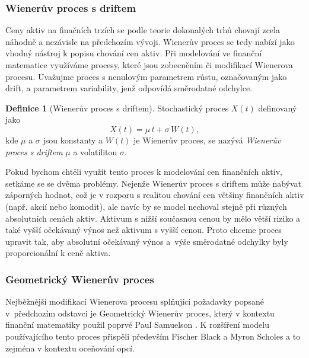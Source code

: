 \documentclass[a4paper,12pt]{report}
\theoremstyle{definition} \newtheorem{definice}[veta]{Definice}
\theoremstyle{remark}
\begin{document}
\subsubsection{Wienerův proces s driftem}
Ceny aktiv na finačních trzích se podle teorie dokonalých trhů chovají zcela náhodně a nezávisle na předchozím vývoji.
Wienerův proces se tedy nabízí jako vhodný nástroj k popisu chování cen aktiv.
Při modelování ve finanční matematice využíváme procesy, které jsou zobecněním či modifikací Wienerova procesu. 
Uvažujme proces s nenulovým parametrem růstu, označovaným jako drift, a parametrem variability, jenž odpovídá směrodatné odchylce.
\begin{definice}[Wienerův proces s driftem]\label{Wieneruv_proces_s_driftem}
Stochastický proces $X(t)$ definovaný jako
$$X(t)  = \mu\, t + \sigma\, W (t),$$
kde $\mu$ a $\sigma$ jsou konstanty a $W (t)$ je Wienerův proces,
se nazývá \textit{Wienerův proces  s driftem} $\mu$ a volatilitou $\sigma$.
\end{definice}
Pokud bychom chtěli využít tento proces k modelování cen finančních aktiv, setkáme se se dvěma problémy.
Nejenže Wienerův proces s driftem může nabývat záporných hodnot, což je v rozporu s realitou chování cen většiny finančních aktiv (např. akcií nebo komodit), ale navíc by se model nechoval stejně při různých absolutních cenách aktiv. 
Aktivum s nižší současnou cenou by mělo větší riziko a také vyšší očekávaný výnos než aktivum s vyšší cenou.
Proto chceme proces upravit tak, aby absolutní očekávaný výnos a~výše směrodatné odchylky byly proporcionální k ceně aktiva. 

\subsubsection{Geometrický Wienerův proces}
Nejběžnější modifikací Wienerova procesu splňující požadavky popsané v~předchozím odstavci je Geometrický Wienerův proces, který v kontextu finanční matematiky použil poprvé Paul Samuelson \cite{samuelson1965rational}.
K rozšíření modelu používajícího tento proces přispěli především Fischer Black a Myron Scholes \cite{black1973pricing} a to zejména v kontextu oceňování opcí.
\end{document}
